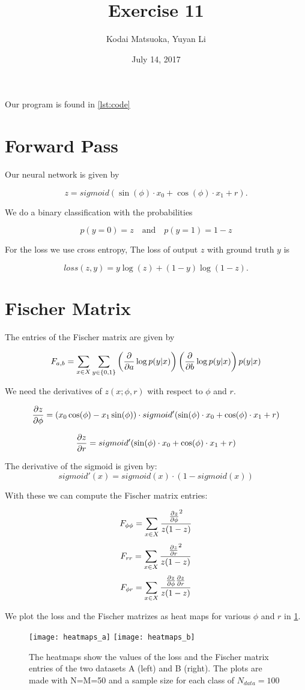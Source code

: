 \documentclass[12pt]{scrartcl}
\author{Kodai Matsuoka, Yuyan Li}
\title{Exercise 11}
\date{July 14, 2017}
\begin{document}
\maketitle

Our program is found in \cref{lst:code}

\section{Forward Pass}

Our neural network is given by

\[
  z = sigmoid(\sin(\phi) \cdot x_0 + \cos(\phi) \cdot x_1 + r).
\]

We do a binary classification with the probabilities

\[ p(y=0)=z \quad \text{and} \quad p(y=1)=1-z \]

For the loss we use cross entropy, The loss of output $z$ with ground truth $y$ is

\[
  loss(z,y) = y \log(z) + (1 - y) \log(1-z).
\]


\section{Fischer Matrix}

The entries of the Fischer matrix are given by

\[
  F_{a,b} = \sum_{x \in X} \sum_{y \in \{0,1\}} \left( \pdv{}{a} \log p(y|x) \right) \left( \pdv{}{b} \log p(y|x) \right) p(y|x)
\]

We need the derivatives of $z(x;\phi,r)$ with respect to $\phi$ and $r$.

\[
  \pdv{z}{\phi} = \left( x_0 \cos(\phi) - x_1 \sin(\phi) \right) \cdot sigmoid'(\sin(\phi) \cdot x_0 + \cos(\phi) \cdot x_1 + r)
\]

\[
  \pdv{z}{r} = sigmoid'(\sin(\phi) \cdot x_0 + \cos(\phi) \cdot x_1 + r)
\]

The derivative of the sigmoid is given by:
\[
  sigmoid'(x) = sigmoid(x) \cdot (1 - sigmoid(x))
\]

With these we can compute the Fischer matrix entries:

\[
  F_{\phi \phi} = \sum_{x \in X} \frac{\pdv{z}{\phi}^2}{z(1-z)}
\]
\[
  F_{rr} = \sum_{x \in X} \frac{\pdv{z}{r}^2}{z(1-z)}
\]
\[
  F_{\phi r} = \sum_{x \in X} \frac{\pdv{z}{\phi} \pdv{z}{r}}{z(1-z)}
\]

We plot the loss and the Fischer matrizes as heat maps for various $\phi$ and $r$ in \cref{fig:hm}.

\begin{figure}[h]
  \centering
  \texttt{[image: heatmaps\_a]}
  \texttt{[image: heatmaps\_b]}
  \caption{The heatmaps show the values of the loss and the Fischer matrix entries of the two datasets A (left) and B (right). The plots are made with N=M=50 and a sample size for each class of $N_{data}=100$}
  \label{fig:hm}
\end{figure}




\clearpage

\end{document}
